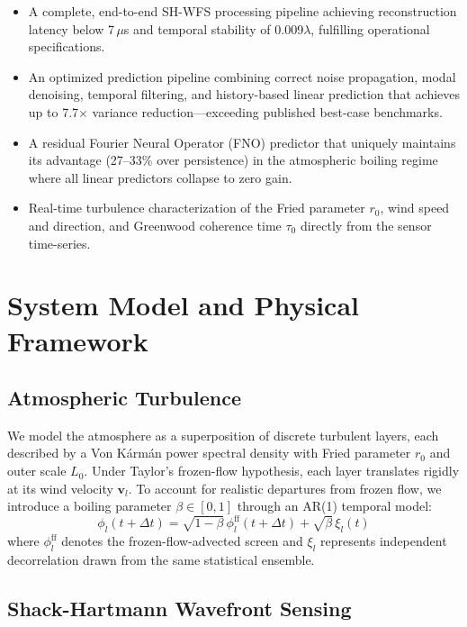 \documentclass[conference]{IEEEtran}
\begin{document}
\begin{itemize}
\item A complete, end-to-end SH-WFS processing pipeline achieving reconstruction latency below 7\,$\mu$s and temporal stability of 0.009$\lambda$, fulfilling operational specifications.
\item An optimized prediction pipeline combining correct noise propagation, modal denoising, temporal filtering, and history-based linear prediction that achieves up to 7.7$\times$ variance reduction---exceeding published best-case benchmarks.
\item A residual Fourier Neural Operator (FNO) predictor that uniquely maintains its advantage (27--33\% over persistence) in the atmospheric boiling regime where all linear predictors collapse to zero gain.
\item Real-time turbulence characterization of the Fried parameter $r_0$, wind speed and direction, and Greenwood coherence time $\tau_0$ directly from the sensor time-series.
\end{itemize}

\section{System Model and Physical Framework}

\subsection{Atmospheric Turbulence}

We model the atmosphere as a superposition of discrete turbulent layers, each described by a Von K\'{a}rm\'{a}n power spectral density with Fried parameter $r_0$ and outer scale $L_0$. Under Taylor's frozen-flow hypothesis, each layer translates rigidly at its wind velocity $\mathbf{v}_l$. To account for realistic departures from frozen flow, we introduce a boiling parameter $\beta \in [0,1]$ through an AR(1) temporal model:
\begin{equation}
\phi_l(t+\Delta t) = \sqrt{1-\beta}\,\phi_l^{\text{ff}}(t+\Delta t) + \sqrt{\beta}\,\xi_l(t)
\end{equation}
where $\phi_l^{\text{ff}}$ denotes the frozen-flow-advected screen and $\xi_l$ represents independent decorrelation drawn from the same statistical ensemble.

\subsection{Shack-Hartmann Wavefront Sensing}
\end{document}
